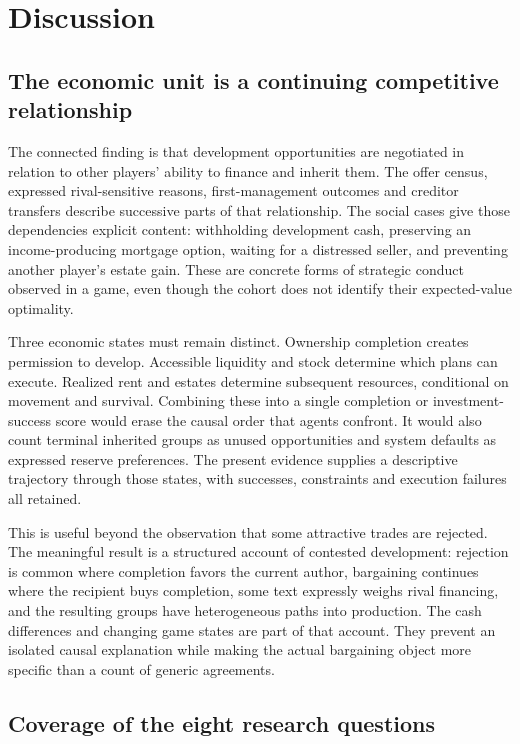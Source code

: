 \section{Discussion}

\subsection{The economic unit is a continuing competitive relationship}

The connected finding is that development opportunities are negotiated in relation to other players' ability to finance and inherit them. The offer census, expressed rival-sensitive reasons, first-management outcomes and creditor transfers describe successive parts of that relationship. The social cases give those dependencies explicit content: withholding development cash, preserving an income-producing mortgage option, waiting for a distressed seller, and preventing another player's estate gain. These are concrete forms of strategic conduct observed in a game, even though the cohort does not identify their expected-value optimality.

Three economic states must remain distinct. Ownership completion creates permission to develop. Accessible liquidity and stock determine which plans can execute. Realized rent and estates determine subsequent resources, conditional on movement and survival. Combining these into a single completion or investment-success score would erase the causal order that agents confront. It would also count terminal inherited groups as unused opportunities and system defaults as expressed reserve preferences. The present evidence supplies a descriptive trajectory through those states, with successes, constraints and execution failures all retained.

This is useful beyond the observation that some attractive trades are rejected. The meaningful result is a structured account of contested development: rejection is common where completion favors the current author, bargaining continues where the recipient buys completion, some text expressly weighs rival financing, and the resulting groups have heterogeneous paths into production. The cash differences and changing game states are part of that account. They prevent an isolated causal explanation while making the actual bargaining object more specific than a count of generic agreements.

\subsection{Coverage of the eight research questions}

